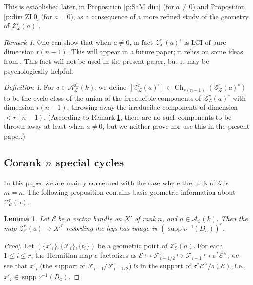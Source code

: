 \documentclass[reqno]{amsart}
\numberwithin{equation}{section}
\DeclareMathOperator{\Ch}{Ch}
\DeclareMathOperator{\supp}{supp}
\DeclareMathOperator{\all}{all}
\newcommand{\incl}{\hookrightarrow}
\newcommand{\s}{\sigma}
\newcommand\cA{\mathcal{A}}
\newcommand\cE{\mathcal{E}}
\newcommand\cF{\mathcal{F}}
\newcommand\cL{\mathcal{L}}
\newcommand\cZ{\mathcal{Z}}
\newtheorem{lemma}[thm]{Lemma}
\theoremstyle{remark}
\newtheorem{remark}[thm]{Remark}
\newtheorem{defn}[thm]{Definition}
\numberwithin{equation}{section}
\begin{document}
This is established later, in Proposition \ref{p:ShM dim} (for $a\ne0$) and Proposition \ref{p:dim ZL0} (for $a=0$),  as a consequence of a more refined study of the geometry of $\cZ_{\cL}^{r}(a)^{\circ}$. 

\begin{remark}\label{rem: actual dimension}
One can show that when $a\ne0$, in fact $\cZ_{\cL}^{r}(a)^{\circ}$ is LCI of pure dimension $r(n-1)$. This will appear in a future paper; it relies on some ideas from \cite{FYZ2}. This fact will not be used in the present paper, but it may be psychologically helpful. 
\end{remark}

\begin{defn}\label{def: m=1 cycle class} 
For $a \in \cA^{\all}_{\cL}(k)$, we define $[ \cZ_{\cL}^{r}(a)^{\circ} ] \in \Ch_{r(n-1)}( \cZ_{\cL}^{r}(a)^{\circ})$ to be the cycle class of the union of the irreducible components of $\cZ_{\cL}^{r}(a)^{\circ} $ with dimension $r(n-1)$, throwing away the irreducible components of dimension $<r(n-1)$. (According to Remark \ref{rem: actual dimension}, there are no such components to be thrown away at least when $a\ne0$, but we neither prove nor use this in the present paper.)  
\end{defn}




\subsection{Corank $n$ special cycles}
In this paper we are mainly concerned with the case where the rank of $\cE$ is $m=n$.   The following proposition contains basic geometric information about $\cZ^{r}_{\cE}(a)$. 

\begin{lemma}\label{l:KR cycle legs}
Let $\cE$ be a vector bundle on $X'$ of rank $n$, and $a\in \cA_{\cE}(k)$. Then the map $\cZ^{r}_{\cE}(a)\to X'^{r}$ recording  the legs has image in $(\supp\nu^{-1}(D_{a}))^{r}$.
\end{lemma}
\begin{proof} Let $(\{x'_{i}\}, \{\cF_{i}\}, \{t_{i}\})$ be a geometric point of $\cZ^{r}_{\cE}(a)$. For each $1\le i\le r$,  the Hermitian map $a$ factorizes as $\cE\incl \cF^{\flat}_{i-1/2}\incl \cF_{i-1}\incl \s^{*}\cE^{\vee}$, we see that $x'_{i}$ (the support of $\cF_{i-1}/\cF^{\flat}_{i-1/2}$) is in the support of $\sigma^*\cE^{\vee}/a(\cE)$, i.e., $x'_{i}\in \supp \nu^{-1}(D_{a})$.
\end{proof}
\end{document}
